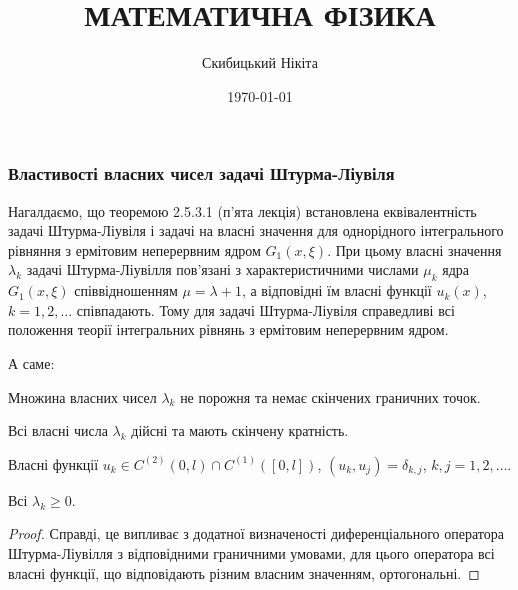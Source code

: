  

 \title{{\Huge МАТЕМАТИЧНА ФІЗИКА}}
 \author{Скибицький Нікіта}
 \date{\today}

 

 

 \tableofcontents

% 
% 
% 
% 
% 

 \setcounter{section}{2}
 \setcounter{subsection}{5}
 \setcounter{subsubsection}{3}
 \setcounter{theorem}{8}
 \setcounter{equation}{36}

\subsubsection{Властивості власних чисел задачі Штурма-Ліувіля}

Нагалдаємо, що теоремою 2.5.3.1 (п'ята лекція) %
встановлена еквівалентність задачі Штурма-Ліувіля і задачі на власні значення для однорідного інтегрального рівняння з ермітовим неперервним ядром $G_1(x, \xi)$. При цьому власні значення $\lambda_k$ задачі Штурма-Ліувілля пов'язані з характеристичними числами $\mu_k$ ядра $G_1(x, \xi)$ співвідношенням $\mu = \lambda + 1$, а відповідні їм власні функції $u_k(x)$, $k = 1, 2, \ldots$ співпадають. Тому для задачі Штурма-Ліувіля справедливі всі положення теорії інтегральних рівнянь з ермітовим неперервним ядром. \medskip

А саме:
\begin{proposition}
	Множина власних чисел $\lambda_k$ не порожня та немає скінчених граничних точок.
\end{proposition}
	
\begin{proposition}
	Всі власні числа $\lambda_k$ дійсні та мають скінчену кратність.
\end{proposition}
	
\begin{proposition}
	Власні функції $u_k\in C^{(2)}(0,l)\cap C^{(1)}([0, l])$, $(u_k, u_j) = \delta_{k,j}$, $k,j=1,2,\ldots$.
\end{proposition}
	
\begin{proposition}
	Всі $\lambda_k \ge 0$.
\end{proposition}

\begin{proof}
	Справді, це випливає з додатної визначеності диференціального оператора Штурма-Ліувілля з відповідними граничними умовами, для цього оператора всі власні функції, що відповідають різним власним значенням, ортогональні.
\end{proof}

